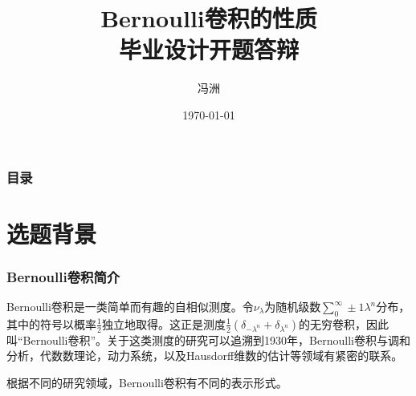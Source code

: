 \documentclass{beamer}
\title[开题答辩]{Bernoulli卷积的性质 \\ \small{毕业设计开题答辩}} %
\author{冯洲} %
\institute[HUST] %
{
华中科技大学 \\ %
\medskip
\textit{U201510104@hust.edu.cn} %
}
\date{\today} %
\numberwithin{equation}{section}
\theoremstyle{definition} \newtheorem{law}[thm]{Law}
\theoremstyle{plain} \newtheorem{jury}[thm]{Jury}
\theoremstyle{remark} \newtheorem*{marg}{Margaret}
\newcommand{\pmone}{\pm1}
\begin{document}
\begin{frame}
	\titlepage %
\end{frame}


\begin{frame}
	\frametitle{目录} %
	\tableofcontents %
\end{frame}


\section{选题背景} %


\begin{frame}
	\frametitle{Bernoulli卷积简介}\small
	Bernoulli卷积是一类简单而有趣的自相似测度。令$ \nu_{\lambda} $为随机级数$ \sum_{0}^{\infty} \pmone\lambda^{n} $分布，其中的符号以概率$ \frac{1}{2} $独立地取得。这正是测度$ \frac{1}{2}(\delta_{-\lambda^{n}}+\delta_{\lambda^{n}}) $的无穷卷积，因此叫``Bernoulli卷积''。关于这类测度的研究可以追溯到1930年，Bernoulli卷积与调和分析，代数数理论，动力系统，以及Hausdorff维数的估计等领域有紧密的联系。


	根据不同的研究领域，Bernoulli卷积有不同的表示形式。\cite{Sixtyyears}

\end{frame}
\end{document}
